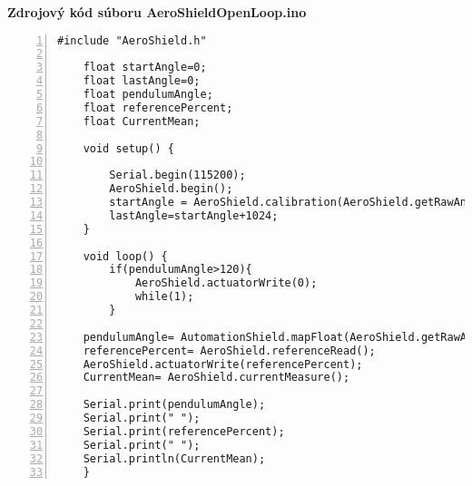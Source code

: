 \LARGE\bf{Zdrojový kód súboru AeroShieldOpenLoop.ino}
\label{AeroShieldOpenLoop.ino}
\vspace{1cm}
\begin{lstlisting}[numbers=left,basicstyle=\scriptsize,caption={Zdrojový kód súboru AeroShieldOpenLoop.ino.},captionpos=b]	
	#include "AeroShield.h" 
	
	float startAngle=0; 
	float lastAngle=0; 
	float pendulumAngle;  
	float referencePercent;  
	float CurrentMean; 
	
	void setup() {
		
		Serial.begin(115200);   
		AeroShield.begin();
		startAngle = AeroShield.calibration(AeroShield.getRawAngle());
		lastAngle=startAngle+1024;  
	}
	
	void loop() {
		if(pendulumAngle>120){
			AeroShield.actuatorWrite(0);
			while(1);
		}
		
	pendulumAngle= AutomationShield.mapFloat(AeroShield.getRawAngle(),startAngle,lastAngle,0.00,90.00);  
	referencePercent= AeroShield.referenceRead(); 
	AeroShield.actuatorWrite(referencePercent);    
	CurrentMean= AeroShield.currentMeasure();

	Serial.print(pendulumAngle);  
	Serial.print(" ");
	Serial.print(referencePercent); 
	Serial.print(" ");
	Serial.println(CurrentMean);
	}
\end{lstlisting}